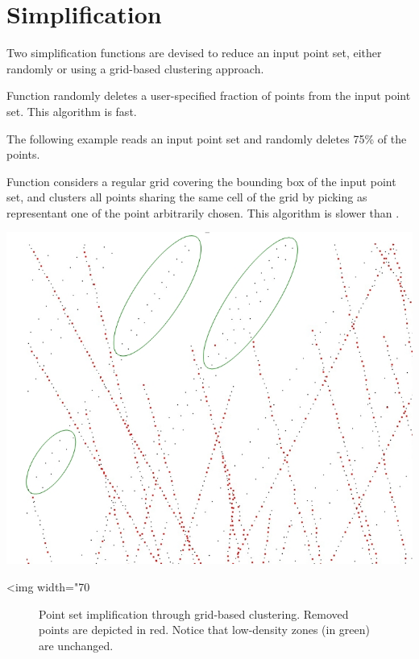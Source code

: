 \section{Simplification}

Two simplification functions are devised to reduce an input point set, either randomly or using a grid-based clustering approach.

Function  randomly deletes a user-specified fraction of points from the input point set. This algorithm is fast.

\ccExample

The following example reads an input point set and randomly deletes 75\% of the points.

Function  considers a regular grid covering the bounding box of the input point set, and clusters all points sharing the same cell of the grid by picking as representant one of the point arbitrarily chosen. This algorithm is slower than .

\begin{center}
    \label{Point_set_processing_3-fig-grid_simplification}
    \begin{ccTexOnly}
        \includegraphics[width=1.0\textwidth]{Point_set_processing_3/grid_simplification} %
    \end{ccTexOnly}
    \begin{ccHtmlOnly}
        <img width="70%
    \end{ccHtmlOnly}
    \begin{figure}[h]
        \caption{Point set implification through grid-based clustering.
                 Removed points are depicted in red. Notice that low-density zones (in green) are unchanged.}
    \end{figure}
\end{center}



